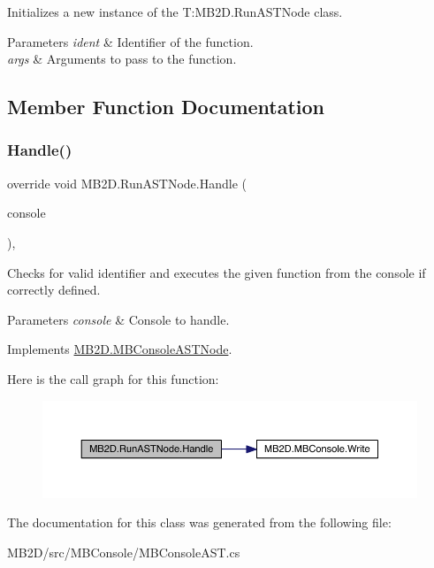 Initializes a new instance of the T\+:\+M\+B2\+D.\+Run\+A\+S\+T\+Node class. 


\begin{DoxyParams}{Parameters}
{\em ident} & Identifier of the function.\\
\hline
{\em args} & Arguments to pass to the function.\\
\hline
\end{DoxyParams}


\subsection{Member Function Documentation}
\hypertarget{class_m_b2_d_1_1_run_a_s_t_node_a20845d86608c81357f4347c29dcaf2c8}{}\label{class_m_b2_d_1_1_run_a_s_t_node_a20845d86608c81357f4347c29dcaf2c8} 
\subsubsection{\texorpdfstring{Handle()}{Handle()}}
{\footnotesize\ttfamily override void M\+B2\+D.\+Run\+A\+S\+T\+Node.\+Handle (\begin{DoxyParamCaption}\item[{\hyperlink{class_m_b2_d_1_1_m_b_console}{M\+B\+Console}}]{console }\end{DoxyParamCaption})\hspace{0.3cm}{\ttfamily [inline]}, {\ttfamily [virtual]}}



Checks for valid identifier and executes the given function from the console if correctly defined. 


\begin{DoxyParams}{Parameters}
{\em console} & Console to handle.\\
\hline
\end{DoxyParams}


Implements \hyperlink{class_m_b2_d_1_1_m_b_console_a_s_t_node_aa70a49e61ab623698af4ed8fda4ebbf5}{M\+B2\+D.\+M\+B\+Console\+A\+S\+T\+Node}.

Here is the call graph for this function\+:
\nopagebreak
\begin{figure}[H]
\begin{center}
\leavevmode
\includegraphics[width=350pt]{class_m_b2_d_1_1_run_a_s_t_node_a20845d86608c81357f4347c29dcaf2c8_cgraph}
\end{center}
\end{figure}


The documentation for this class was generated from the following file\+:\begin{DoxyCompactItemize}
\item 
M\+B2\+D/src/\+M\+B\+Console/M\+B\+Console\+A\+S\+T.\+cs\end{DoxyCompactItemize}

